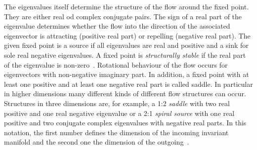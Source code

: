 \documentclass[paper=a4,11pt,bibliography=totoc]{scrartcl}
\begin{document}
The eigenvalues itself determine the structure of the flow around the fixed point. They are either real od complex conjugate pairs. The sign of a real part of the eigenvalue determines whether the flow into the direction of the associated eigenvector is attracting (positive real part) or repelling (negative real part). The given fixed point is a source if all eigenvalues are real and positive and a sink for sole real negative eigenvalues. A fixed point is \textit{structurally stable} if the real part of the eigenvalue is non-zero~\cite{Sadlo2017}. Rotational behaviour of the flow occurs for eigenvectors with non-negative imaginary part. In addition, a fixed point with at least one positive and at least one negative real part is called saddle. In particular in higher dimensions many different kinds of different flow structures can occur. Structures in three dimensions are, for example, a 1:2 \textit{saddle} with two real positive and one real negative eigenvalue or a 2:1 \textit{spiral source} with one real positive and two conjugate complex eigenvalues with negative real parts. In this notation, the first number defines the dimension of the incoming invariant manifold and the second one the dimension of the outgoing~\cite{Sadlo2017}.
\end{document}
